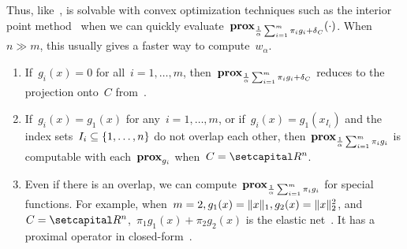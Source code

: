 \documentclass[../../main]{subfiles}
\begin{document}
                        Thus, like~,  is solvable with convex optimization techniques such as the interior point method~\cite{Bertsekas1999} when we can quickly evaluate~$\prox_{\frac{1}{\alpha} \sum_{i = 1}^{m} \pi_i g_i + \indicator_C}(\cdot)$.
                        When~$n \gg m$, this usually gives a faster way to compute~$w_\alpha$.
                        \begin{example}
                            \begin{enumerate}
                                \item If~$g_i(x) = 0$ for all~$i = 1, \dots, m$, then~$\prox_{\frac{1}{\alpha} \sum_{i = 1}^{m} \pi_i g_i + \indicator_C}$ reduces to the projection onto~$C$ from~.
                                \item If~$g_i(x) = g_1(x)$ for any~$i = 1, \dots, m$, or if~$g_i(x) = g_1(x_{I_i})$ and the index sets~$I_i \subseteq \set*{1, \dots, n}$ do not overlap each other, then~$\prox_{\frac{1}{\alpha} \sum_{i = 1}^{m} \pi_i g_i}$ is computable with each~$\prox_{g_i}$ when~$C = \setR^n$.
                                \item Even if there is an overlap, we can compute~$\prox_{\frac{1}{\alpha} \sum_{i = 1}^{m} \pi_i g_i}$ for special functions.
                                    For example, when~$m = 2, g_1(x) = \norm{x}_1, g_2(x) = \norm{x}_2^2$, and~$C = \setR^n$,~$\pi_1 g_1(x) + \pi_2 g_2(x)$ is the elastic net~\cite{Zou2005}. 
                                    It has a proximal operator in closed-form~\cite[Section 6.5.3]{Parikh2014}.
                            \end{enumerate}
                        \end{example}
\end{document}
